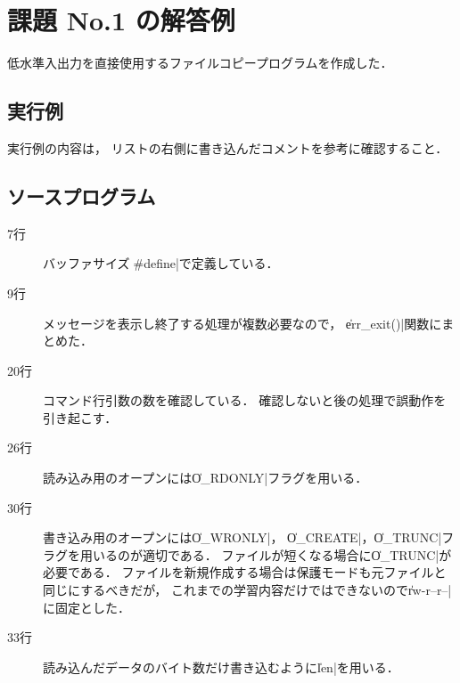 \documentclass[a4j,twcolumn,11pt,nomag]{ltjarticle}      %
\begin{document}
\onecolumn

\section*{課題 No.1 の解答例}
低水準入出力を直接使用するファイルコピープログラムを作成した．

\subsection*{実行例}
実行例の内容は，
リストの右側に書き込んだコメントを参考に確認すること．

\subsection*{ソースプログラム}
\begin{description}
\item[7行] バッファサイズを\|#define|で定義している．
\item[9行] メッセージを表示し終了する処理が複数必要なので，
\|err_exit()|関数にまとめた．
\item[20行] コマンド行引数の数を確認している．
確認しないと後の処理で誤動作を引き起こす．
\item[26行] 読み込み用のオープンには\|O_RDONLY|フラグを用いる．
\item[30行] 書き込み用のオープンには\|O_WRONLY|，
\|O_CREATE|，\|O_TRUNC|フラグを用いるのが適切である．
ファイルが短くなる場合に\|O_TRUNC|が必要である．
ファイルを新規作成する場合は保護モードも元ファイルと同じにするべきだが，
これまでの学習内容だけではできないので\|rw-r--r--|に固定とした．
\item[33行] 読み込んだデータのバイト数だけ書き込むように\|len|を用いる．
\end{description}

\end{document}
